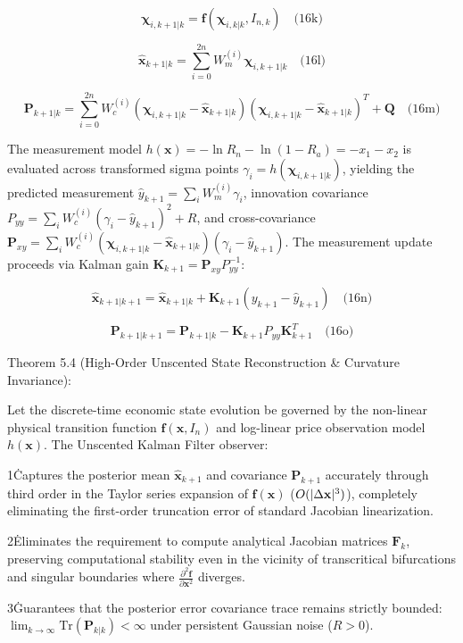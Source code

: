 \documentclass[preprint,12pt,authoryear]{elsarticle}
\theoremstyle{definition}
\begin{document}
$$\boldsymbol{\chi}_{i, k+1|k} = \mathbf{f}(\boldsymbol{\chi}_{i, k|k}, I_{n,k}) \quad \text{(16k)}$$

$$\hat{\mathbf{x}}_{k+1|k} = \sum_{i=0}^{2n} W_m^{(i)} \boldsymbol{\chi}_{i, k+1|k} \quad \text{(16l)}$$

$$\mathbf{P}_{k+1|k} = \sum_{i=0}^{2n} W_c^{(i)} (\boldsymbol{\chi}_{i, k+1|k} - \hat{\mathbf{x}}_{k+1|k})(\boldsymbol{\chi}_{i, k+1|k} - \hat{\mathbf{x}}_{k+1|k})^T + \mathbf{Q} \quad \text{(16m)}$$

The measurement model $h(\mathbf{x}) = -\ln R_n - \ln(1 - R_a) = -x_1 - x_2$ is evaluated across transformed sigma points $\gamma_i = h(\boldsymbol{\chi}_{i, k+1|k})$, yielding the predicted measurement $\hat{y}_{k+1} = \sum_i W_m^{(i)} \gamma_i$, innovation covariance $P_{yy} = \sum_i W_c^{(i)} (\gamma_i - \hat{y}_{k+1})^2 + R$, and cross-covariance $\mathbf{P}_{xy} = \sum_i W_c^{(i)} (\boldsymbol{\chi}_{i, k+1|k} - \hat{\mathbf{x}}_{k+1|k})(\gamma_i - \hat{y}_{k+1})$. The measurement update proceeds via Kalman gain $\mathbf{K}_{k+1} = \mathbf{P}_{xy} P_{yy}^{-1}$:

$$\hat{\mathbf{x}}_{k+1|k+1} = \hat{\mathbf{x}}_{k+1|k} + \mathbf{K}_{k+1} (y_{k+1} - \hat{y}_{k+1}) \quad \text{(16n)}$$

$$\mathbf{P}_{k+1|k+1} = \mathbf{P}_{k+1|k} - \mathbf{K}_{k+1} P_{yy} \mathbf{K}_{k+1}^T \quad \text{(16o)}$$

Theorem 5.4 (High-Order Unscented State Reconstruction \& Curvature Invariance):

Let the discrete-time economic state evolution be governed by the non-linear physical transition function $\mathbf{f}(\mathbf{x}, I_n)$ and log-linear price observation model $h(\mathbf{x})$. The Unscented Kalman Filter observer:

1\. Captures the posterior mean $\hat{\mathbf{x}}_{k+1}$ and covariance $\mathbf{P}_{k+1}$ accurately through third order in the Taylor series expansion of $\mathbf{f}(\mathbf{x})$ ($O(\\|\Delta \mathbf{x}\\|^3)$), completely eliminating the first-order truncation error of standard Jacobian linearization.

2\. Eliminates the requirement to compute analytical Jacobian matrices $\mathbf{F}_k$, preserving computational stability even in the vicinity of transcritical bifurcations and singular boundaries where $\frac{\partial^2 \mathbf{f}}{\partial \mathbf{x}^2}$ diverges.

3\. Guarantees that the posterior error covariance trace remains strictly bounded: $\lim_{k \to \infty} \text{Tr}(\mathbf{P}_{k|k}) < \infty$ under persistent Gaussian noise ($R > 0$).
\end{document}
